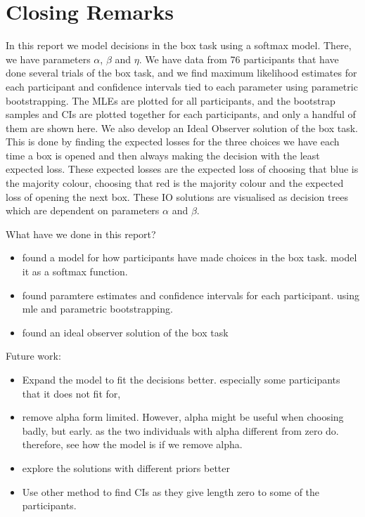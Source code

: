 \chapter{Closing Remarks}
In this report we model decisions in the box task using a softmax model. There, we have parameters $\alpha$, $\beta$ and $\eta$. We have data from 76 participants that have done several trials of the box task, and we find maximum likelihood estimates for each participant and confidence intervals tied to each parameter using parametric bootstrapping. The MLEs are plotted for all participants, and the bootstrap samples and CIs are plotted together for each participants, and only a handful of them are shown here. 
We also develop an Ideal Observer solution of the box task. This is done by finding the expected losses for the three choices we have each time a box is opened and then always making the decision with the least expected loss. These expected losses are the expected loss of choosing that blue is the majority colour, choosing that red is the majority colour and the expected loss of opening the next box. These IO solutions are visualised as decision trees which are dependent on parameters $\alpha$ and $\beta$.



What have we done in this report? 
\begin{itemize}
    \item found a model for how participants have made choices in the box task. model it as a softmax function. 
    \item found paramtere estimates and confidence intervals for each participant. using mle and parametric bootstrapping.
    \item found an ideal observer solution of the box task
\end{itemize}




Future work:
\begin{itemize}
    \item Expand the model to fit the decisions better. especially some participants that it does not fit for,
    \item remove alpha form limited. However, alpha might be useful when choosing badly, but early. as the two individuals with alpha different from zero do. therefore, see how the model is if we remove alpha. 
    \item explore the solutions with different priors better
    \item Use other method to find CIs as they give length zero to some of the participants. 
\end{itemize}

